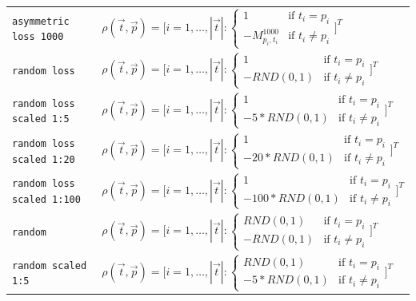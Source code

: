 \documentclass[twoside,11pt]{article}
\begin{document}
\begin{longtabu}{p{3cm}X}
    \texttt{asymmetric loss 1000}
    &$\rho(\vec{t}, \vec{p}) = \Bigg[
      i=1,\dots,|\vec{t}|:
      \begin{cases}
        1  &\text{if } t_i = p_i \\
        -M^{1000}_{p_i,t_i} &\text{if } t_i \neq p_i
      \end{cases} \Bigg]^T$\\

    \texttt{random loss}
    &$\rho(\vec{t}, \vec{p}) = \Bigg[
      i=1,\dots,|\vec{t}|:
      \begin{cases}
        1  &\text{if } t_i = p_i \\
        -RND(0,1) &\text{if } t_i \neq p_i
      \end{cases} \Bigg]^T$\\

    \texttt{random loss scaled 1:5}
    &$\rho(\vec{t}, \vec{p}) = \Bigg[
      i=1,\dots,|\vec{t}|:
      \begin{cases}
        1  &\text{if } t_i = p_i \\
        -5*RND(0,1) &\text{if } t_i \neq p_i
      \end{cases} \Bigg]^T$\\

    \texttt{random loss scaled 1:20}
    &$\rho(\vec{t}, \vec{p}) = \Bigg[
      i=1,\dots,|\vec{t}|:
      \begin{cases}
        1  &\text{if } t_i = p_i \\
        -20 * RND(0,1) &\text{if } t_i \neq p_i
      \end{cases} \Bigg]^T$\\

    \texttt{random loss scaled 1:100}
    &$\rho(\vec{t}, \vec{p}) = \Bigg[
      i=1,\dots,|\vec{t}|:
      \begin{cases}
        1  &\text{if } t_i = p_i \\
        -100 * RND(0,1) &\text{if } t_i \neq p_i
      \end{cases}\Bigg]^T$\\

    \texttt{random}
    &$\rho(\vec{t}, \vec{p}) = \Bigg[
      i=1,\dots,|\vec{t}|:
      \begin{cases}
        RND(0,1) &\text{if } t_i = p_i \\
        -RND(0,1) &\text{if } t_i \neq p_i
      \end{cases} \Bigg]^T$\\

    \texttt{random scaled 1:5}
    &$\rho(\vec{t}, \vec{p}) = \Bigg[
      i=1,\dots,|\vec{t}|:
      \begin{cases}
        RND(0,1)  &\text{if } t_i = p_i \\
        -5 * RND(0,1) &\text{if } t_i \neq p_i
      \end{cases} \Bigg]^T$\\


\end{longtabu}
\end{document}
